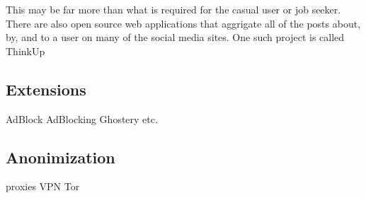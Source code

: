 \documentclass[man]{apa}%
\begin{document}
This may be far more than what is required for the casual user or job seeker.
There are also open source web applications that aggrigate all of the posts
about, by, and to a user on many of the social media sites. One such project is
called ThinkUp

\subsection{Extensions}
AdBlock
AdBlocking 
Ghostery
etc.

\subsection{Anonimization}
proxies
VPN
Tor


\end{document}
